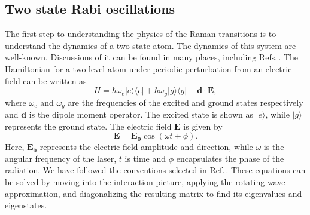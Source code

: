 \subsection{Two state Rabi oscillations}
\label{twoStateSection}
The first step to understanding the physics of the Raman transitions is to understand the dynamics of a two state atom. The dynamics of this system are well-known. Discussions of it can be found in many places, including Refs.\,\cite{cohenTannoudji,demilleBudkerKimball,Young1997363}. The Hamiltonian for a two level atom under periodic perturbation from an electric field can be written as 
\begin{equation}
H = \hbar \omega_e |e\rangle\langle e| + \hbar \omega_g |g\rangle\langle g| - \mathbf{d}\cdot\mathbf{E},
\end{equation} 
where $\omega_e$ and $\omega_g$ are the frequencies of the excited and ground states respectively and $\mathbf{d}$ is the dipole moment operator. The excited state is shown as $|e\rangle$, while $|g\rangle$ represents the ground state. The electric field $\mathbf{E}$ is given by 
\begin{equation}
\mathbf{E} = \mathbf{E_0} \cos (\omega t + \phi).
\end{equation}
Here, $\mathbf{E_0}$ represents the electric field amplitude and direction, while $\omega$ is the angular frequency of the laser, $t$ is time and $\phi$ encapsulates the phase of the radiation.
We have followed the conventions selected in Ref.\,\cite{Young1997363}. 
These equations can be solved by moving into the interaction picture, applying the rotating wave approximation, and diagonalizing the resulting matrix to find its eigenvalues and eigenstates.

